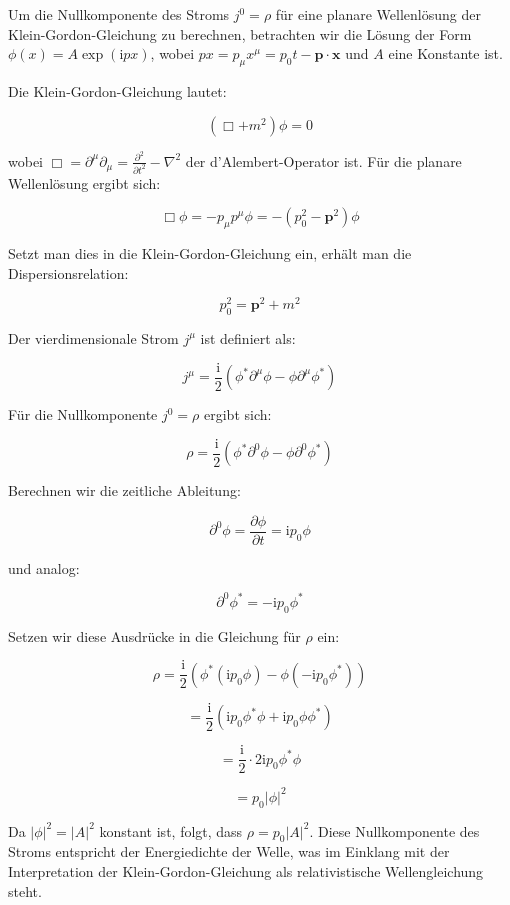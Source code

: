 Um die Nullkomponente des Stroms $j^0 = \rho$ für eine planare Wellenlösung der Klein-Gordon-Gleichung zu berechnen, betrachten wir die Lösung der Form $\phi(x) = A \exp(\mathrm{i} p x)$, wobei $p x = p_\mu x^\mu = p_0 t - \mathbf{p} \cdot \mathbf{x}$ und $A$ eine Konstante ist.

Die Klein-Gordon-Gleichung lautet:

\[
(\Box + m^2) \phi = 0
\]

wobei $\Box = \partial^\mu \partial_\mu = \frac{\partial^2}{\partial t^2} - \nabla^2$ der d'Alembert-Operator ist. Für die planare Wellenlösung ergibt sich:

\[
\Box \phi = -p_\mu p^\mu \phi = -(p_0^2 - \mathbf{p}^2) \phi
\]

Setzt man dies in die Klein-Gordon-Gleichung ein, erhält man die Dispersionsrelation:

\[
p_0^2 = \mathbf{p}^2 + m^2
\]

Der vierdimensionale Strom $j^\mu$ ist definiert als:

\[
j^\mu = \frac{\mathrm{i}}{2} \left( \phi^* \partial^\mu \phi - \phi \partial^\mu \phi^* \right)
\]

Für die Nullkomponente $j^0 = \rho$ ergibt sich:

\[
\rho = \frac{\mathrm{i}}{2} \left( \phi^* \partial^0 \phi - \phi \partial^0 \phi^* \right)
\]

Berechnen wir die zeitliche Ableitung:

\[
\partial^0 \phi = \frac{\partial \phi}{\partial t} = \mathrm{i} p_0 \phi
\]

und analog:

\[
\partial^0 \phi^* = -\mathrm{i} p_0 \phi^*
\]

Setzen wir diese Ausdrücke in die Gleichung für $\rho$ ein:

\[
\rho = \frac{\mathrm{i}}{2} \left( \phi^* (\mathrm{i} p_0 \phi) - \phi (-\mathrm{i} p_0 \phi^*) \right)
\]

\[
= \frac{\mathrm{i}}{2} \left( \mathrm{i} p_0 \phi^* \phi + \mathrm{i} p_0 \phi \phi^* \right)
\]

\[
= \frac{\mathrm{i}}{2} \cdot 2 \mathrm{i} p_0 \phi^* \phi
\]

\[
= p_0 |\phi|^2
\]

Da $|\phi|^2 = |A|^2$ konstant ist, folgt, dass $\rho = p_0 |A|^2$. Diese Nullkomponente des Stroms entspricht der Energiedichte der Welle, was im Einklang mit der Interpretation der Klein-Gordon-Gleichung als relativistische Wellengleichung steht.